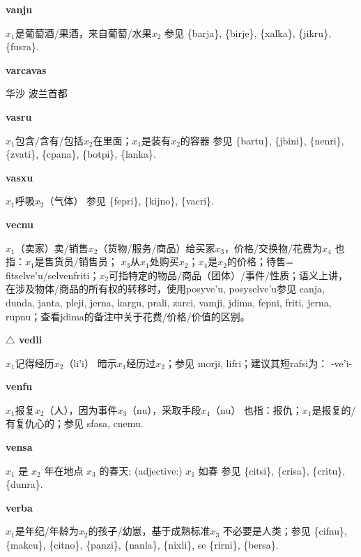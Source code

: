\documentclass[notitlepage,twocolumn,a4paper,10pt]{book}
\begin{document}
{\sffamily\bfseries vanju}\enspace {\ttfamily\bfseries[van]}  $x_1$是葡萄酒\slash{}果酒，来自葡萄\slash{}水果$x_2$ \textemdash{} 参见 \{barja\}, \{birje\}, \{xalka\}, \{jikru\}, \{fusra\}.

{\sffamily\bfseries varcavas} 华沙 \textemdash{} 波兰首都

{\sffamily\bfseries vasru}  $x_1$包含\slash{}含有\slash{}包括$x_2$在里面；$x_1$是装有$x_2$的容器 \textemdash{} 参见 \{bartu\}, \{jbini\}, \{nenri\}, \{zvati\}, \{cpana\}, \{botpi\}, \{lanka\}.

{\sffamily\bfseries vasxu}\enspace {\ttfamily\bfseries[vax     va'u]}  $x_1$呼吸$x_2$（气体） \textemdash{} 参见 \{fepri\}, \{kijno\}, \{vacri\}.

{\sffamily\bfseries vecnu}\enspace {\ttfamily\bfseries[ven     ve'u]}  $x_1$（卖家）卖\slash{}销售$x_2$（货物\slash{}服务\slash{}商品）给买家$x_3$，价格\slash{}交换物\slash{}花费为$x_4$ \textemdash{} 也指：$x_1$是售货员\slash{}销售员； $x_3$从$x_1$处购买$x_2$；$x_4$是$x_2$的价格；待售= {fitselve'u}\slash{}{selvenfriti}；$x_2$可指特定的物品\slash{}商品（团体）\slash{}事件\slash{}性质；语义上讲，在涉及物体\slash{}商品的所有权的转移时，使用{posyve'u}, {posyselve'u}参见 {canja}, {dunda}, {janta}, {pleji}, {jerna}, {kargu}, {prali}, {zarci}, {vamji}, {jdima}, {fepni}, {friti}, {jerna}, {rupnu}；查看{jdima}的备注中关于花费\slash{}价格\slash{}价值的区别。

{\sffamily\bfseries $\triangle$ vedli} $x_1$记得经历$x_2$（li'i） \textemdash{} 暗示$x_1$经历过$x_2$；参见 {morji}, {lifri}；建议其短rafsi为： -ve'i-

{\sffamily\bfseries venfu}\enspace {\ttfamily\bfseries[vef]}  $x_1$报复$x_2$（人），因为事件$x_3$（nu），采取手段$x_4$（nu） \textemdash{} 也指：报仇；$x_1$是报复的\slash{}有复仇心的；参见 {sfasa}, {cnemu}.

{\sffamily\bfseries vensa}\enspace {\ttfamily\bfseries[ves]}  $x_{1}$ 是 $x_{2}$ 年在地点 $x_{3}$ 的春天; (adjective:) $x_{1}$ 如春 \textemdash{} 参见 \{citsi\}, \{crisa\}, \{critu\}, \{dunra\}.

{\sffamily\bfseries verba}\enspace {\ttfamily\bfseries[ver     ve'a]}  $x_1$是年纪\slash{}年龄为$x_2$的孩子\slash{}幼崽，基于成熟标准$x_3$ \textemdash{} 不必要是人类；参见 \{cifnu\}, \{makcu\}, \{citno\}, \{panzi\}, \{nanla\}, \{nixli\}, se \{rirni\}, \{bersa\}.
\end{document}
